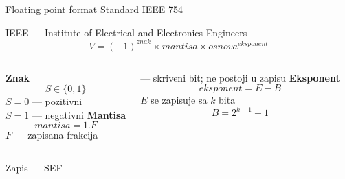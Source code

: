 \begin{frame}[label=06-s012]{Floating point format}
Standard IEEE 754\par
IEEE — Institute of Electrical and Electronics Engineers
\[V=(-1)^{znak}\times\mathit{mantisa}\times\mathit{osnova}^{eksponent}\]
\smallskip
\begin{columns}[T,onlytextwidth]
\centering\textbf{Znak}
\[S\in\{0,1\}\]
$S=0$ — pozitivni\\$S=1$ — negativni
\centering\textbf{Mantisa}
\[\mathit{mantisa}=1.F\]
$F$ — zapisana frakcija\par{} — skriveni bit; ne postoji u zapisu
\centering\textbf{Eksponent}
\[\mathit{eksponent}=E-B\]
$E$ se zapisuje sa $k$ bita
\[B=2^{k-1}-1\]
\end{columns}\medskip
\centering\alert{Zapis — S\quad E\quad F}
\end{frame}
